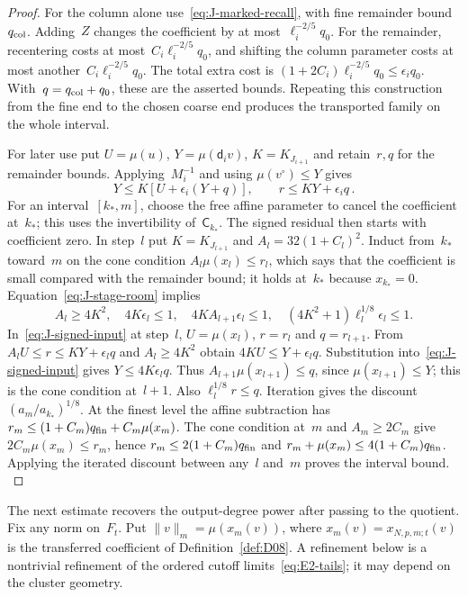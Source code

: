 \begin{proof}
For the column alone use~\eqref{eq:J-marked-recall}, with fine remainder bound~$q_{\rm col}$. Adding~$Z$ changes the coefficient by at most~$\ell_i^{-2/5}q_0$. For the remainder, recentering costs at most~$C_i\ell_i^{-2/5}q_0$, and shifting the column parameter costs at most another~$C_i\ell_i^{-2/5}q_0$. The total extra cost is $(1+2C_i)\ell_i^{-2/5}q_0\le\epsilon_iq_0$. With~$q=q_{\rm col}+q_0$, these are the asserted bounds. Repeating this construction from the fine end to the chosen coarse end produces the transported family on the whole interval.

For later use put $U=\mu(u)$, $Y=\mu(\mathsf d_iv)$, $K=K_{J_{i+1}}$ and retain~$r,q$ for the remainder bounds. Applying~$M_i^{-1}$ and using $\mu(v^\circ)\le Y$ gives
\begin{equation}\label{eq:J-signed-input}
Y\le K[U+\epsilon_i(Y+q)],\qquad r\le KY+\epsilon_iq\,.
\end{equation}
For an interval~$[k_*,m]$, choose the free affine parameter to cancel the coefficient at~$k_*$; this uses the invertibility of~$\mathsf C_{k_*}$. The signed residual then starts with coefficient zero. In step~$l$ put $K=K_{J_{l+1}}$ and $A_l=32(1+C_l)^2$. Induct from~$k_*$ toward~$m$ on the cone condition $A_l\mu(x_l)\le r_l$, which says that the coefficient is small compared with the remainder bound; it holds at~$k_*$ because $x_{k_*}=0$. Equation~\eqref{eq:J-stage-room} implies
\begin{equation*}
A_l\ge4K^2,\quad4K\epsilon_l\le1,\quad
4KA_{l+1}\epsilon_l\le1,\quad
(4K^2+1)\ell_l^{1/8}\epsilon_l\le1.
\end{equation*}
In~\eqref{eq:J-signed-input} at step~$l$, $U=\mu(x_l)$, $r=r_l$ and $q=r_{l+1}$. From $A_lU\le r\le KY+\epsilon_lq$ and $A_l\ge4K^2$ obtain $4KU\le Y+\epsilon_lq$. Substitution into~\eqref{eq:J-signed-input} gives $Y\le4K\epsilon_lq$. Thus $A_{l+1}\mu(x_{l+1})\le q$, since $\mu(x_{l+1})\le Y$; this is the cone condition at~$l+1$. Also $\ell_l^{1/8}r\le q$. Iteration gives the discount~$(a_m/a_{k_*})^{1/8}$. At the finest level the affine subtraction has $r_m\le(1+C_m)q_{\rm fin}+C_m\mu(x_m)$. The cone condition at~$m$ and $A_m\ge2C_m$ give $2C_m\mu(x_m)\le r_m$, hence $r_m\le2(1+C_m)q_{\rm fin}$ and $r_m+\mu(x_m)\le4(1+C_m)q_{\rm fin}$. Applying the iterated discount between any~$l$ and~$m$ proves the interval bound.
\label{proof:J-signed-end}
\end{proof}

The next estimate recovers the output-degree power after passing to the quotient. Fix any norm on~$F_t$. Put $\|v\|_m=\mu(x_m(v))$, where $x_m(v)=x_{N,p,m;t}(v)$ is the transferred coefficient of Definition~\ref{def:D08}. A refinement below is a nontrivial refinement of the ordered cutoff limits~\eqref{eq:E2-tails}; it may depend on the cluster geometry.

